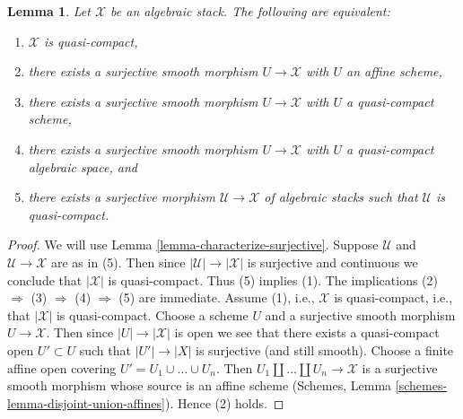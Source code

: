 \documentclass[10pt,a4paper]{amsart}
\theoremstyle{plain}
\newtheorem{lemma}[subsection]{Lemma}
\theoremstyle{definition}
\theoremstyle{remark}
\numberwithin{equation}{subsection}
\begin{document}
\begin{lemma}
\label{lemma-quasi-compact-stack}
Let $\mathcal{X}$ be an algebraic stack.
The following are equivalent:
\begin{enumerate}
\item $\mathcal{X}$ is quasi-compact,
\item there exists a surjective smooth morphism $U \to \mathcal{X}$
with $U$ an affine scheme,
\item there exists a surjective smooth morphism $U \to \mathcal{X}$
with $U$ a quasi-compact scheme,
\item there exists a surjective smooth morphism $U \to \mathcal{X}$
with $U$ a quasi-compact algebraic space, and
\item there exists a surjective morphism $\mathcal{U} \to \mathcal{X}$
of algebraic stacks such that $\mathcal{U}$ is quasi-compact.
\end{enumerate}
\end{lemma}

\begin{proof}
We will use
Lemma \ref{lemma-characterize-surjective}.
Suppose $\mathcal{U}$ and $\mathcal{U} \to \mathcal{X}$ are as in (5).
Then since $|\mathcal{U}| \to |\mathcal{X}|$ is surjective and
continuous we conclude that $|\mathcal{X}|$ is quasi-compact.
Thus (5) implies (1). The implications
(2) $\Rightarrow$ (3) $\Rightarrow$ (4) $\Rightarrow$ (5)
are immediate. Assume (1), i.e., $\mathcal{X}$ is quasi-compact, i.e., that
$|\mathcal{X}|$ is quasi-compact. Choose a scheme $U$ and a surjective
smooth morphism $U \to \mathcal{X}$. Then since $|U| \to |\mathcal{X}|$
is open we see that there exists a quasi-compact open $U' \subset U$
such that $|U'| \to |X|$ is surjective (and still smooth).
Choose a finite affine open covering $U' = U_1 \cup \ldots \cup U_n$.
Then $U_1 \amalg \ldots \amalg U_n \to \mathcal{X}$
is a surjective smooth morphism whose source is an
affine scheme (Schemes, Lemma \ref{schemes-lemma-disjoint-union-affines}).
Hence (2) holds.
\end{proof}
\end{document}
